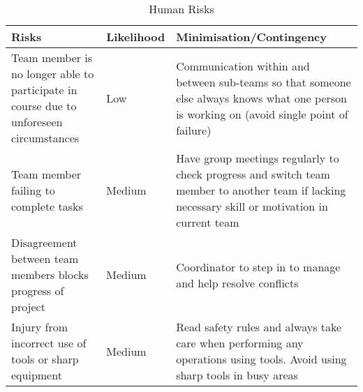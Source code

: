 

\begin{table}[H]
\begin{tabular}{ |p{2.15cm}|p{1.45cm}|p{3.8cm}|  }
 \hline
 \textbf{Risks}& \textbf{Likelihood}& \textbf{Minimisation/Contingency}\\
 \hline
 Team member is no longer able to participate in course due to unforeseen circumstances & Low& Communication within and between sub-teams so that someone else always knows what one person is working on (avoid single point of failure)\\
 \hline
 Team member failing to complete tasks& Medium& Have group meetings regularly to check progress and switch team member to another team if lacking necessary skill or motivation in current team\\
 \hline
 Disagreement between team members blocks progress of project& Medium& Coordinator to step in to manage and help resolve conflicts\\
 \hline
  Injury from incorrect use of tools or sharp equipment& Medium& Read safety rules and always take care when performing any operations using tools. Avoid using sharp tools in busy areas\\
 \hline
 
\end{tabular}
\vspace*{-3mm}
\caption{Human Risks}
\label{tab:humanrisk}
\end{table}
